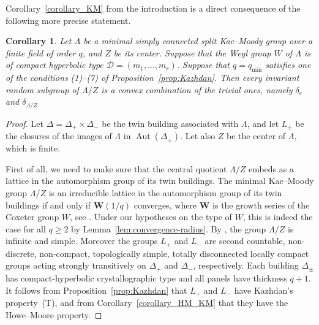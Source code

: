 \documentclass[12pt,a4paper]{amsproc}
\newtheorem{corollary}[theorem]{Corollary}
\theoremstyle{definition}
\newcommand{\qmin}{q_{\mathrm{min}}}
\begin{document}
Corollary~\ref{corollary_KM} from the introduction is a direct consequence of the following more precise statement. 



\begin{corollary}\label{cor:KM-sharp}
Let $\Lambda$ be a minimal simply connected split Kac--Moody group over a finite field of order $q$, and $Z$ be its center. Suppose that the Weyl group $W$ of $\Lambda$ is of compact hyperbolic type $\mathcal D = (m_1, \dots, m_r)$. Suppose that $q = \qmin$ satisfies one of the conditions (1)--(7) of Proposition~\ref{prop:Kazhdan}. Then every invariant random subgroup of  $\Lambda/Z$ is a convex combination of the trivial ones, namely $\delta_e$ and $\delta_{\Lambda/Z}$
\end{corollary}
\begin{proof}
Let \(\Delta=\Delta_+\times\Delta_-\) be the twin building associated with
\(\Lambda\), and let \(L_\pm\) be the closures of the images of
\(\Lambda\) in \(\operatorname{Aut}(\Delta_\pm)\). Let also $Z$ be the center of $\Lambda$, which is finite.  

 First of all, we need to make sure that   the central quotient $\Lambda/Z$ embeds as a lattice in the automorphism group of its twin buildings. 
The minimal Kac--Moody group $\Lambda/Z$ is an irreducible lattice in the automorphism group of its twin buildings if and only if $\mathbf W(1/q)$ converges, where $\mathbf W$ is the  growth series of the Coxeter group $W$, see \cite{RemyCRAS}. Under our hypotheses on the type of $W$, this is indeed the case for all $q \geq 2$ by Lemma~\ref{lem:convergence-radius}.
By
\cite[Theorem~15 and Corollary~16]{CapRem}, the group \(\Lambda/Z\) is   infinite
and simple. Moreover the groups \(L_+\) and \(L_-\) are second countable,
non-discrete, non-compact, topologically simple,  totally disconnected
 locally compact groups acting strongly transitively on
\(\Delta_+\) and \(\Delta_-\), respectively.  Each building \(\Delta_\pm\) has compact-hyperbolic
crystallographic type and all panels have thickness \(q+1\).  It follows from Proposition~\ref{prop:Kazhdan} that $L_+$ and $L_-$ have Kazhdan's property~(T), and from  Corollary~\ref{corollary_HM_KM} that they have the Howe--Moore property. 





\end{proof}
\end{document}

